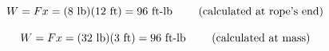 \vskip 10pt

$$W = F x = (8 \hbox{ lb}) (12 \hbox{ ft}) = 96 \hbox{ ft-lb \hskip 20pt (calculated at rope's end)}$$

$$W = F x = (32 \hbox{ lb}) (3 \hbox{ ft}) = 96 \hbox{ ft-lb \hskip 20pt (calculated at mass)}$$











